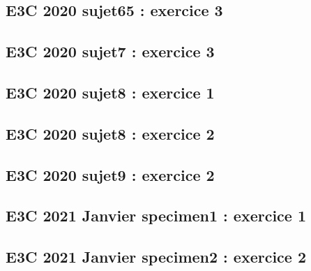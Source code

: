 \documentclass[lang=fr,edition=teacher,layout=sheet]{mxbook}
\begin{document}
\par\bigskip
{}\subsection*{E3C 2020 sujet65 : exercice 3}
\begingroup\endgroup
\par\bigskip
{}\subsection*{E3C 2020 sujet7 : exercice 3}
\begingroup\endgroup
\par\bigskip
{}\subsection*{E3C 2020 sujet8 : exercice 1}
\begingroup\endgroup
\par\bigskip
{}\subsection*{E3C 2020 sujet8 : exercice 2}
\begingroup\endgroup
\par\bigskip
{}\subsection*{E3C 2020 sujet9 : exercice 2}
\begingroup\endgroup
\par\bigskip
{}\subsection*{E3C 2021 Janvier specimen1 : exercice 1}
\begingroup\endgroup
\par\bigskip
{}\subsection*{E3C 2021 Janvier specimen2 : exercice 2}
\begingroup\endgroup
\par\bigskip
\end{document}
